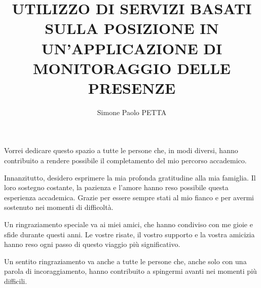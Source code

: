 \title{UTILIZZO DI SERVIZI BASATI SULLA POSIZIONE IN UN'APPLICAZIONE DI MONITORAGGIO DELLE PRESENZE}
\author{Simone Paolo PETTA}
%
% 
%
\beforepreface
%
%
Vorrei dedicare questo spazio a tutte le persone che, in modi diversi, hanno contribuito a rendere possibile il completamento del mio percorso accademico.

\medskip

Innanzitutto, desidero esprimere la mia profonda gratitudine alla mia famiglia. Il loro sostegno costante, la pazienza e l'amore hanno reso possibile questa esperienza accademica. Grazie per essere sempre stati al mio fianco e per avermi sostenuto nei momenti di difficoltà.

\medskip

Un ringraziamento speciale va ai miei amici, che hanno condiviso con me gioie e sfide durante questi anni. Le vostre risate, il vostro supporto e la vostra amicizia hanno reso ogni passo di questo viaggio più significativo.

\medskip

Un sentito ringraziamento va anche a tutte le persone che, anche solo con una parola di incoraggiamento, hanno contribuito a spingermi avanti nei momenti più difficili.

